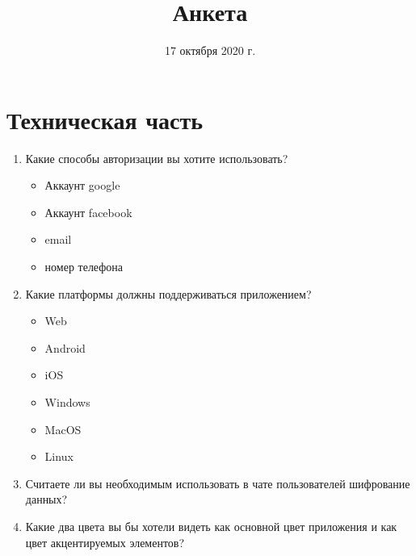 \documentclass{article}
\title{Анкета}
\author{}
\date{17 октября 2020 г.}
\newcommand{\red}[1]{\uline{\hspace*{1cm}\textcolor{white}{#1}\hspace*{1cm}}}
\begin{document}
  \maketitle

  \section{Техническая часть}
  \begin{enumerate}[label=\arabic*)]
    \item Какие способы авторизации вы хотите использовать?
    \begin{itemize}[label=$\square$]
      \item Аккаунт google
      \item Аккаунт facebook
      \item email
      \item номер телефона
    \end{itemize}

    \item Какие платформы должны поддерживаться приложением?
    \begin{itemize}[label=$\square$]
      \item Web
      \item Android
      \item iOS
      \item Windows
      \item MacOS
      \item Linux
    \end{itemize}

    \item Считаете ли вы необходимым использовать в чате пользователей шифрование данных? \vspace{.2cm} \\
    \red{\hspace{10cm}}

    \item Какие два цвета вы бы хотели видеть как основной цвет приложения и как цвет акцентируемых элементов? \vspace{.2cm} \\
    \red{\hspace{10cm}}


\end{enumerate}
\end{document}
